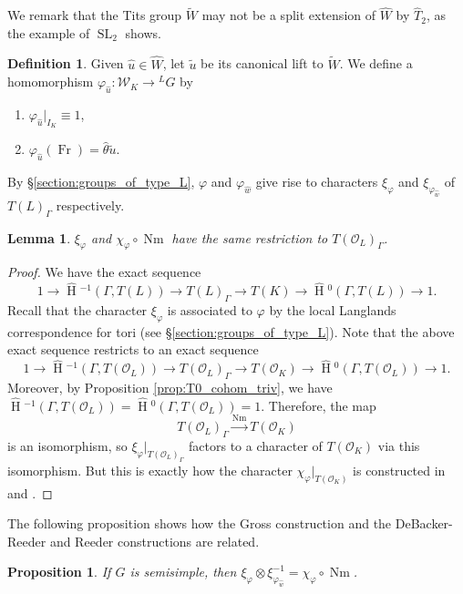 \documentclass[11pt]{amsart}
\theoremstyle{plain}
\newtheorem{proposition}[theorem]{Proposition}
\newtheorem{lemma}[theorem]{Lemma}
\newcommand{\HT}[1]{\hat{\HH}{}^{#1}}
\theoremstyle{definition}
\newtheorem{definition}[theorem]{Definition}
\DeclareMathOperator{\HH}{H}
\DeclareMathOperator{\Nm}{Nm}
\DeclareMathOperator{\Fr}{Fr}
\DeclareMathOperator{\SL}{SL}
\newcommand{\OK}{\mathcal{O}_K}
\newcommand{\OL}{\mathcal{O}_L}
\newcommand{\Weil}{\mathcal{W}}
\begin{document}
We remark that the Tits group $\widetilde{W}$ may not be a split extension of $\hat{W}$ by $\hat{T}_2$, as the example of $\SL_2$ shows.

\begin{definition}
Given $\hat{u} \in \hat{W}$, let $\tilde{u}$ be its canonical lift to $\widetilde{W}$.
We define a homomorphism $\varphi_{\hat{u}} : \Weil_K \rightarrow {}^L G$ by
\begin{enumerate}
\item $\varphi_{\hat{u}}|_{I_K} \equiv 1$,
\item $\varphi_{\hat{u}}(\Fr) = \hat{\theta} \tilde{u}$.
\end{enumerate}
\end{definition}

By
\S\ref{section:groups_of_type_L}, $\varphi$ and $\varphi_{\hat{w}}$ give rise to characters
$\xi_{\varphi}$ and $\xi_{\varphi_{\hat{w}}}$ of $T(L)_{\Gamma}$ respectively.

\begin{lemma} \label{lem:GDR_compat}
$\xi_{\varphi}$ and $\chi_{\varphi} \circ \Nm$ have the same restriction to $T(\OL)_{\Gamma}$.
\end{lemma}

\begin{proof}
We have the exact sequence
$$1 \rightarrow \HT{-1}(\Gamma, T(L)) \rightarrow T(L)_{\Gamma} \rightarrow T(K)
  \rightarrow \HT{0}(\Gamma, T(L)) \rightarrow 1.$$
Recall that the character $\xi_{\varphi}$ is associated to $\varphi$ by
the local Langlands correspondence for tori (see \S\ref{section:groups_of_type_L}).
Note that the above exact sequence restricts to an exact sequence
$$1 \rightarrow \HT{-1}(\Gamma, T(\OL)) \rightarrow T(\OL)_{\Gamma}
  \rightarrow T(\OK) \rightarrow \HT{0}(\Gamma, T(\OL)) \rightarrow 1.$$
Moreover, by Proposition \ref{prop:T0_cohom_triv}, we have
$\HT{-1}(\Gamma, T(\OL)) = \HT{0}(\Gamma, T(\OL)) = 1$.
Therefore, the map
$$T(\OL)_{\Gamma} \xrightarrow{\Nm} T(\OK)$$
is an isomorphism, so
$\xi_{\varphi}|_{T(\OL)_{\Gamma}}$ factors to a character of
$T(\OK)$ via this isomorphism.  But this is exactly how the character
$\chi_{\varphi}|_{T(\OK)}$ is constructed in \cite{reeder-debacker:09a} and \cite{reeder:08a}.
\end{proof}

The following proposition shows how the Gross construction and the DeBacker-Reeder and Reeder constructions are related.

\begin{proposition}\label{prop:existenceofrectifier}
If $G$ is semisimple, then $\xi_{\varphi} \otimes \xi_{\varphi_{\hat{w}}}^{-1} = \chi_{\varphi} \circ \Nm$.
\end{proposition}
\end{document}
